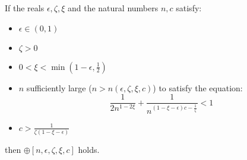     \lemma[Lemma 4.19]\label{n_large_enough_valid_values}
        If the reals $\epsilon, \zeta, \xi$ and the natural numbers $n, c$ satisfy:
        \begin{itemize}
            \item $\epsilon \in (0,1)$
            \item $\zeta > 0$
            \item $0 < \xi < \min(1-\epsilon, \frac{1}{2})$
            \item $n$ sufficiently large ($n > n(\epsilon, \zeta, \xi, c)$) to satisfy the equation:\[
                \frac{1}{2n^{1-2\xi}} + \frac{1}{n^{(1 - \xi - \epsilon)c - \frac{1}{\zeta}}} < 1
            \]
            \item $c > \frac{1}{\zeta (1 - \xi - \epsilon)}$
        \end{itemize}
            then $\oplus[n, \epsilon, \zeta, \xi, c]$ holds.
